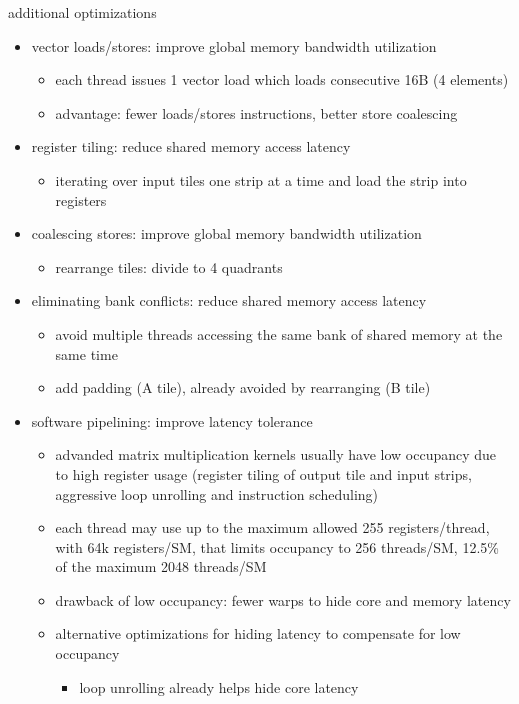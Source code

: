 \documentclass{article}
\begin{document}
additional optimizations

\begin{itemize}
\item vector loads/stores: improve global memory bandwidth utilization
\begin{itemize}
\item each thread issues 1 vector load which loads consecutive 16B (4 elements)
\item advantage: fewer loads/stores instructions, better store coalescing
\end{itemize}
\item register tiling: reduce shared memory access latency
\begin{itemize}
\item iterating over input tiles one strip at a time and load the strip into registers
\end{itemize}
\item coalescing stores: improve global memory bandwidth utilization
\begin{itemize}
\item rearrange tiles: divide to 4 quadrants
\end{itemize}
\item eliminating bank conflicts: reduce shared memory access latency
\begin{itemize}
\item avoid multiple threads accessing the same bank of shared memory at the same time
\item add padding (A tile), already avoided by rearranging (B tile)
\end{itemize}
\item software pipelining: improve latency tolerance
\begin{itemize}
\item advanded matrix multiplication kernels usually have low occupancy due to high register usage (register tiling of output tile and input strips, aggressive loop unrolling and instruction scheduling)
\item each thread may use up to the maximum allowed 255 registers/thread, with 64k registers/SM, that limits occupancy to 256 threads/SM, 12.5\% of the maximum 2048 threads/SM
\item drawback of low occupancy: fewer warps to hide core and memory latency
\item alternative optimizations for hiding latency to compensate for low occupancy
\begin{itemize}
\item loop unrolling already helps hide core latency

\end{itemize}
\end{itemize}
\end{itemize}
\end{document}
